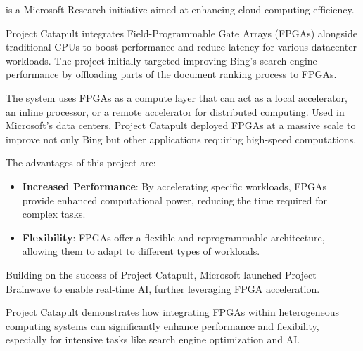 \begin{examplebox}
     is a Microsoft Research initiative aimed at enhancing cloud computing efficiency.

    \highspace
    Project Catapult integrates Field-Programmable Gate Arrays (FPGAs) alongside traditional CPUs to boost performance and reduce latency for various datacenter workloads. The project initially targeted improving Bing's search engine performance by offloading parts of the document ranking process to FPGAs.

    \highspace
    The system uses FPGAs as a compute layer that can act as a local accelerator, an inline processor, or a remote accelerator for distributed computing. Used in Microsoft's data centers, Project Catapult deployed FPGAs at a massive scale to improve not only Bing but other applications requiring high-speed computations.

    \highspace
    The advantages of this project are:
    \begin{itemize}
        \item \textbf{Increased Performance}: By accelerating specific workloads, FPGAs provide enhanced computational power, reducing the time required for complex tasks.
        \item \textbf{Flexibility}: FPGAs offer a flexible and reprogrammable architecture, allowing them to adapt to different types of workloads.
    \end{itemize}

    \highspace
    Building on the success of Project Catapult, Microsoft launched Project Brainwave to enable real-time AI, further leveraging FPGA acceleration.

    \highspace
    Project Catapult demonstrates how integrating FPGAs within heterogeneous computing systems can significantly enhance performance and flexibility, especially for intensive tasks like search engine optimization and AI.
\end{examplebox}

\newpage

